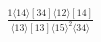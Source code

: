 \documentclass[varwidth, border=5pt]{standalone}
\begin{document}
\begin{my}
$\begin{gathered}
\scriptscriptstyle\frac{1⟨14⟩[34]⟨12⟩[14]}{⟨13⟩[13]⟨15⟩^2⟨34⟩}
\end{gathered}$
\end{my}
\end{document}
